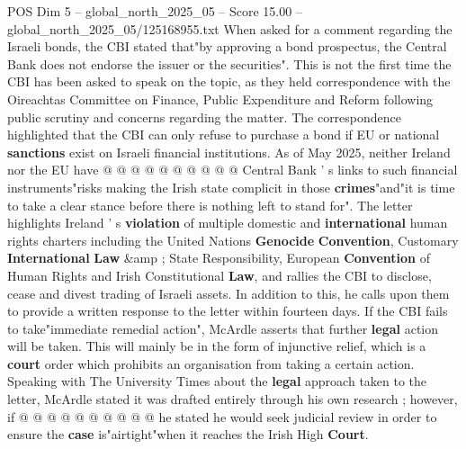 \begin{textsample}{POS Dim 5 – global\_north\_2025\_05 – Score 15.00 – global\_north\_2025\_05/125168955.txt}
When asked for a comment regarding the Israeli bonds, the CBI stated that"by approving a bond prospectus, the Central Bank does not endorse the issuer or the securities".
This is not the first time the CBI has been asked to speak on the topic, as they held correspondence with the Oireachtas Committee on Finance, Public Expenditure and Reform following public scrutiny and concerns regarding the matter.
The correspondence highlighted that the CBI can only refuse to purchase a bond if EU or national \textbf{sanctions} exist on Israeli financial institutions.
As of May 2025, neither Ireland nor the EU have @ @ @ @ @ @ @ @ @ @ Central Bank ' s links to such financial instruments"risks making the Irish state complicit in those \textbf{crimes}"and"it is time to take a clear stance before there is nothing left to stand for".
The letter highlights Ireland ' s \textbf{violation} of multiple domestic and \textbf{international} human rights charters including the United Nations \textbf{Genocide} \textbf{Convention}, Customary \textbf{International} \textbf{Law} \&amp ; State Responsibility, European \textbf{Convention} of Human Rights and Irish Constitutional \textbf{Law}, and rallies the CBI to disclose, cease and divest trading of Israeli assets.
In addition to this, he calls upon them to provide a written response to the letter within fourteen days.
If the CBI fails to take"immediate remedial action", McArdle asserts that further \textbf{legal} action will be taken.
This will mainly be in the form of injunctive relief, which is a \textbf{court} order which prohibits an organisation from taking a certain action.
Speaking with The University Times about the \textbf{legal} approach taken to the letter, McArdle stated it was drafted entirely through his own research ; however, if @ @ @ @ @ @ @ @ @ @ he stated he would seek judicial review in order to ensure the \textbf{case} is"airtight"when it reaches the Irish High \textbf{Court}.

\end{textsample}
